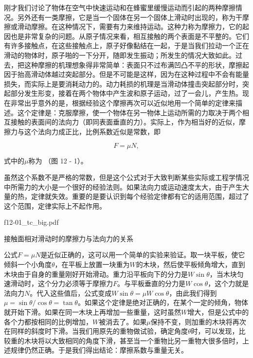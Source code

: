 \documentclass[12pt,oneside]{book}
\begin{document}
刚才我们讨论了物体在空气中快速运动和在蜂蜜里缓慢运动而引起的两种摩擦情况。另外还有一类摩擦，它是当一个固体在另一个固体上滑动时出现的，称为干摩擦或滑动摩擦。在这种情况下，需要有力来维持运动。这种力称为摩擦力，它的起因也是非常复杂的问题。从原子情况来看，相互接触的两个表面是不平整的。它们有许多接触点，在这些接触点上，原子好像黏结在一起，于是当我们拉动一个正在滑动的物体时，原子啪的一下分开，随即发生振动；所发生的情况大致如此。过去，把这种摩擦的机理想象得非常简单：表面只不过布满凹凸不平的形状，摩擦起因于抬高滑动体越过突起部分。但是不可能是这样，因为在这种过程中不会有能量损失，而实际上是要消耗动力的。动力耗损的机理是当滑动体撞击突起部分时，突起部分发生形变，接着在两个物体中产生波和原子运动，过了一会儿，产生热。现在非常出乎意外的是，根据经验这个摩擦再次可以近似地用一个简单的定律来描述。这个定律是：克服摩擦，使一个物体在另一物体上运动所需的力取决于两个相互接触的表面间的法向力（即同表面垂直的力）。实际上，作为相当好的近似，摩擦力与这个法向力成正比，比例系数近似是常数，即


\begin{equation}
\label{Eq:I:12:1}
F=\mu N,
\end{equation}

式中的$\mu$称为 （图 12 - 1）。


虽然这个系数不是严格的常数，但是这个公式对于大致判断某些实际或工程学情况中所需力的大小是一个很好的经验法则。如果法向力或运动速度太大，由于产生大量的热，定律就失效。重要的是要认识到每个经验定律都有它的适用范围，超过了这个范围，定律实际上不起作用。

\begin{fig}{f12-01_tc_big.pdf}
\caption{接触面相对滑动时的摩擦力与法向力的关系}
\label{fig:12-1}
\end{fig}


公式$F = \mu N$是近似正确的，这可以用一个简单的实验来验证。取一块平板，使它倾斜一个小角度$\theta$，在平板上放置一块重为$W$的木块，然后使平板倾角增大，直到木块由于自身的重量刚好开始滑动。重力沿平板向下的分力是$W\sin\theta$，当木块匀速滑动时，这个分力必须等于摩擦力$F$。与平板垂直的分力是$W\cos\theta$，这个力就是法向力$N$。代入这些值后，公式变成$W\sin\theta = \mu W\cos\theta$，由此我们得到$\mu=\sin\theta/\cos\theta=\tan\theta$。如果这个定律是绝对正确的，在某个一定的倾角，物体就开始下滑。如果在同一木块上再增加一些重量，这时虽然$W$增大，但是公式中的各个力都按相同的比例增加，$W$被消去了。如果$\mu$保持不变，则加重的木块将再次在同样的斜度时下滑。当我们用原先的重物做试验，确定角度$\theta$时，可以发现，比较重的木块将以大致相同的角度下滑，甚至当一个重物比另一重物大很多倍时，上述规律仍然正确。于是我们得出结论：摩擦系数与重量无关。
\end{document}
